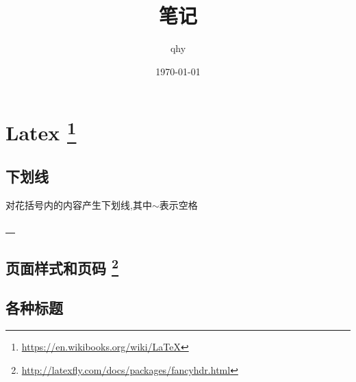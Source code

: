 \documentclass[UTF8,a4paper]{ctexart}
\author{qhy}
\date{\today}
\title{笔记}
\renewcommand{\sectionmark}[1]{\markboth{\thesection.\ #1}{}}
\renewcommand{\headrulewidth}{0.4pt}
\renewcommand{\footrulewidth}{0.4pt}
\begin{document}
    \maketitle
    \tableofcontents
    \newpage

    \section[Latex]{Latex \footnote{\url{https://en.wikibooks.org/wiki/LaTeX}}}
        \subsection{下划线}
        对花括号内的内容产生下划线,其中$\sim$表示空格
        \begin{texcode}
\underline{~~}
        \end{texcode}

        \subsection[页面样式和页码]{页面样式和页码 \footnote{\url{http://latexfly.com/docs/packages/fancyhdr.html}}}
        \begin{texcode}
\usepackage{fancyhdr}

\pagestyle{fancy}
\renewcommand{\sectionmark}[1]{\markboth{\thesection.\ #1}{}}
\lhead{\bfseries \leftmark}

\chead{}
\rhead{}
\rfoot{\thepage}
\setlength{\headheight}{13pt}
\renewcommand{\headrulewidth}{0.4pt}
\renewcommand{\footrulewidth}{0.4pt}

        \end{texcode}


        \subsection{各种标题}
        \begin{texcode}
\chapter
\section
\subsection
\subsubsection
\paragraph
\subparagraph
        \end{texcode}
\end{document}
